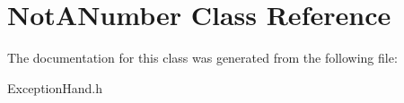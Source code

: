 \hypertarget{class_not_a_number}{}\section{Not\+A\+Number Class Reference}
\label{class_not_a_number}


The documentation for this class was generated from the following file\+:\begin{DoxyCompactItemize}
\item 
Exception\+Hand.\+h\end{DoxyCompactItemize}
